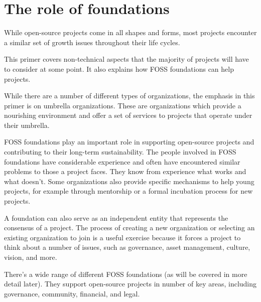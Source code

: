 


\chapter{The role of foundations}

While open-source projects come in all shapes and forms, most projects encounter a similar set of growth issues throughout their life cycles.

This primer covers non-technical aspects that the majority of projects will have to consider at some point.  It also explains how FOSS foundations can help projects.

While there are a number of different types of organizations, the emphasis in this primer is on umbrella organizations.  These are organizations which provide a nourishing environment and offer a set of services to projects that operate under their umbrella.

FOSS foundations play an important role in supporting open-source projects and contributing to their long-term sustainability.  The people involved in FOSS foundations have considerable experience and often have encountered similar problems to those a project faces.  They know from experience what works and what doesn't.  Some organizations also provide specific mechanisms to help young projects, for example through mentorship or a formal incubation process for new projects.

A foundation can also serve as an independent entity that represents the consensus of a project.  The process of creating a new organization or selecting an existing organization to join is a useful exercise because it forces a project to think about a number of issues, such as governance, asset management, culture, vision, and more.

There's a wide range of different FOSS foundations (as will be covered in more detail later).  They support open-source projects in number of key areas, including governance, community, financial, and legal.

